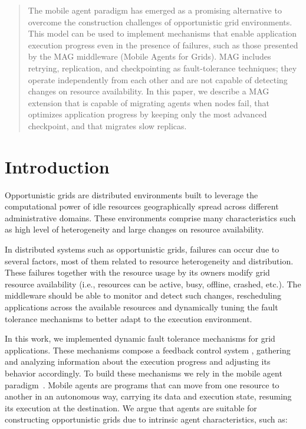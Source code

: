 \documentclass{sig-alternate}
\begin{document}
\maketitle
\begin{abstract}

The mobile agent paradigm has emerged as a promising alternative to overcome
the construction challenges of opportunistic grid environments.
This model can be used to implement mechanisms that enable
application execution progress even in the presence of failures, such as
those presented by the MAG middleware (Mobile Agents for Grids). 
MAG includes retrying, replication, and checkpointing as
fault-tolerance techniques; they operate independently from
each other and are not capable of detecting changes on resource availability.
In this paper, we describe a MAG extension that is capable of migrating agents when 
nodes fail, that optimizes application progress by keeping only the most advanced 
checkpoint, and that migrates slow replicas.

\end{abstract}



\section{Introduction}

Opportunistic grids are distributed environments built to leverage the
computational power of idle resources geographically spread across different
administrative domains. These environments comprise many characteristics such as
high level of heterogeneity and large changes on resource availability. 

In distributed systems such as opportunistic grids, failures can occur due to
several factors, most of them related to resource heterogeneity and
distribution. These failures together with the resource usage by its
owners modify grid resource availability (i.e.,
resources can be active, busy, offline, crashed, etc.). The middleware should
be able to monitor and detect such changes, rescheduling 
applications across the available resources and dynamically tuning the fault
tolerance mechanisms to better adapt to the execution environment. 

In this work, we implemented dynamic fault tolerance mechanisms for grid
applications. These mechanisms compose a feedback control system
\cite{steere99, goel99}, gathering and analyzing information about the execution
progress and adjusting its behavior accordingly. To build these mechanisms we
rely in the mobile agent paradigm~\cite{pham98}. Mobile agents are programs that can move
from one resource to another in an autonomous way, carrying its data and
execution state, resuming its execution at the destination. We argue that
agents are suitable for constructing opportunistic grids due to intrinsic agent characteristics, 
such as:
\end{document}
